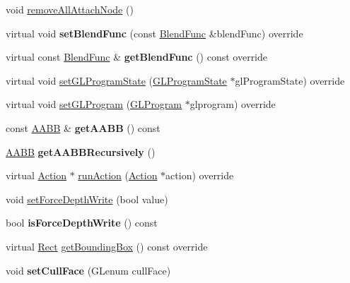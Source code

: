 \begin{DoxyCompactItemize}
\item 
void \hyperlink{classSprite3D_a65c7b8151da52aa226c6fd89942da971}{remove\+All\+Attach\+Node} ()
\item 
\mbox{\label{classSprite3D_a503802b9e0e3ef16d407e3c40629f339}} 
virtual void {\bfseries set\+Blend\+Func} (const \hyperlink{structBlendFunc}{Blend\+Func} \&blend\+Func) override
\item 
\mbox{\label{classSprite3D_a1fa184cc7deb069457d446536e5adf22}} 
virtual const \hyperlink{structBlendFunc}{Blend\+Func} \& {\bfseries get\+Blend\+Func} () const override
\item 
virtual void \hyperlink{classSprite3D_a8bfa814ae2f4584b69dbb776de1c327b}{set\+G\+L\+Program\+State} (\hyperlink{classGLProgramState}{G\+L\+Program\+State} $\ast$gl\+Program\+State) override
\item 
virtual void \hyperlink{classSprite3D_aa71609d7f3a35a0d86a70f28bafffa9c}{set\+G\+L\+Program} (\hyperlink{classGLProgram}{G\+L\+Program} $\ast$glprogram) override
\item 
\mbox{\label{classSprite3D_a6f708b04dd832001250f2bf12ed351c0}} 
const \hyperlink{classAABB}{A\+A\+BB} \& {\bfseries get\+A\+A\+BB} () const
\item 
\mbox{\label{classSprite3D_a53f4be4106345801999a7d55a1984553}} 
\hyperlink{classAABB}{A\+A\+BB} {\bfseries get\+A\+A\+B\+B\+Recursively} ()
\item 
virtual \hyperlink{classAction}{Action} $\ast$ \hyperlink{classSprite3D_acd2905d934e4d7c873b8a1973297d2a8}{run\+Action} (\hyperlink{classAction}{Action} $\ast$action) override
\item 
void \hyperlink{classSprite3D_ae6bea19d97b02dfecb63d8975600aa4a}{set\+Force\+Depth\+Write} (bool value)
\item 
\mbox{\label{classSprite3D_abcf25050e0c2fe4ab2f816b95e1919c2}} 
bool {\bfseries is\+Force\+Depth\+Write} () const
\item 
virtual \hyperlink{classRect}{Rect} \hyperlink{classSprite3D_a90cebd7aa44add4a6726710b5642daf4}{get\+Bounding\+Box} () const override
\item 
\mbox{\label{classSprite3D_a7658e390030b102ad830b6dc0d9eda89}} 
void {\bfseries set\+Cull\+Face} (G\+Lenum cull\+Face)

\end{DoxyCompactItemize}
